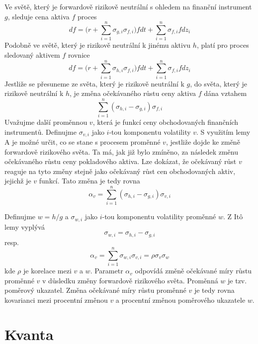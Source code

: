 \documentclass[a4paper]{book}
\begin{document}
Ve světě, který je forwardově rizikově neutrální s ohledem na finanční instrument $g$, sleduje cena aktiva $f$ proces
\begin{equation*}
df = \bigg( r + \sum^n_{i=1} \sigma_{g,i} \sigma_{f,i} \bigg)fdt + \sum^n_{i=1} \sigma_{f,i}fdz_i
\end{equation*}
Podobně ve světě, který je rizikově neutrální k jinému aktivu $h$, platí pro proces sledovaný aktivem $f$ rovnice
\begin{equation*}
df = \bigg( r + \sum^n_{i=1} \sigma_{h,i} \sigma_{f,i} \bigg)fdt + \sum^n_{i=1} \sigma_{f,i}fdz_i
\end{equation*}
Jestliže se přesuneme ze světa, který je rizikově neutrální k $g$, do světa, který je rizikově neutrální k $h$, je změna očekávaného růstu ceny aktiva $f$ dána vztahem
\begin{equation*}
\sum^n_{i=1}(\sigma_{h,i}-\sigma_{g,i})\sigma_{f,i}
\end{equation*}
Uvažujme další proměnnou $v$, která je funkcí ceny obchodovaných finančních instrumentů. Definujme $\sigma_{v,i}$ jako $i$-tou komponentu volatility $v$. S využitím lemy A je možné určit, co se stane s procesem proměnné $v$, jestliže dojde ke změně forwardově rizikového světa. Ta má, jak již bylo zmíněno, za následek změnu očekávaného růstu ceny pokladového aktiva. Lze dokázat, že očekávaný růst $v$ reaguje na tyto změny stejně jako očekávaný růst cen obchodovaných aktiv, jejichž je $v$ funkcí. Tato změna je tedy rovna
\begin{equation*}
\alpha_v = \sum^n_{i=1}(\sigma_{h,i} - \sigma_{g,i})\sigma_{v,i}
\end{equation*}

Definujme $w = h/g$ a $\sigma_{w,i}$ jako $i$-tou komponentu volatility proměnné $w$. Z It\^o lemy vyplývá
\begin{equation*}
\sigma_{w,i} = \sigma_{h,i} - \sigma_{g,i}
\end{equation*}
resp.
\begin{equation}
\alpha_v = \sum^{n}_{i=1} \sigma_{w,i}\sigma_{v,i} = \rho \sigma_v \sigma_w
\end{equation}
kde $\rho$ je korelace mezi $v$ a $w$. Parametr $\alpha_v$ odpovídá změně očekávané míry růstu proměnné $v$ v důsledku změny forwardově rizikového světa. Proměnná $w$ je tzv. poměrový ukazatel. Změna očekávané míry růstu proměnné $v$ je tedy rovna kovarianci mezi procentní změnou $v$ a procentní změnou poměrového ukazatele $w$.

\section{Kvanta}
\end{document}
